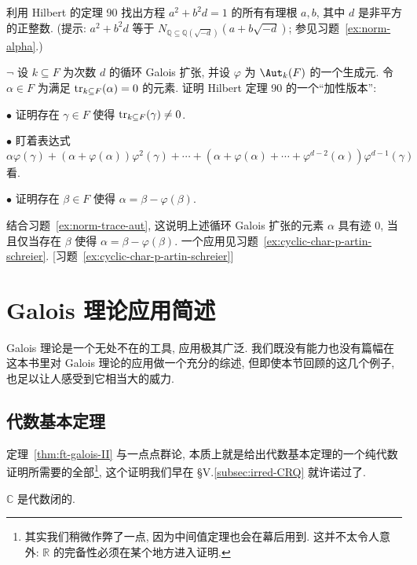 \begin{prob}\label{ex:hilbert90-rational}
利用 Hilbert 的定理 90 找出方程 $a^2+b^2d=1$ 的所有有理根 $a,b$, 其中 $d$ 是非平方的正整数. (提示: $a^2+b^2d$ 等于 $N_{\mathbb{Q}\subseteq\mathbb{Q}(\sqrt{-d})}(a+b\sqrt{-d})$; 参见习题~\ref{ex:norm-alpha}.)
\end{prob}

\begin{prob}\label{ex:hilbert90-additive}
$\neg$ 设 $k\subseteq F$ 为次数 $d$ 的循环 Galois 扩张, 并设 $\varphi$ 为 $\Aut_k(F)$ 的一个生成元. 令 $\alpha\in F$ 为满足 $\operatorname{tr}_{k\subseteq F}(\alpha)=0$ 的元素. 证明 Hilbert 定理 90 的一个``加性版本'':

$\bullet$ 证明存在 $\gamma\in F$ 使得 $\operatorname{tr}_{k\subseteq F}(\gamma)\neq 0$.

$\bullet$ 盯着表达式
\[
\alpha\varphi(\gamma)+(\alpha+\varphi(\alpha))\varphi^2(\gamma)+\cdots+(\alpha+\varphi(\alpha)+\cdots+\varphi^{d-2}(\alpha))\varphi^{d-1}(\gamma)
\]
看.

$\bullet$ 证明存在 $\beta\in F$ 使得 $\alpha=\beta-\varphi(\beta)$.

结合习题~\ref{ex:norm-trace-aut}, 这说明上述循环 Galois 扩张的元素 $\alpha$ 具有迹 $0$, 当且仅当存在 $\beta$ 使得 $\alpha=\beta-\varphi(\beta)$. 一个应用见习题~\ref{ex:cyclic-char-p-artin-schreier}. [习题~\ref{ex:cyclic-char-p-artin-schreier}]
\end{prob}

\section{Galois 理论应用简述}
\label{sec:galois-applications}

Galois 理论是一个无处不在的工具, 应用极其广泛. 我们既没有能力也没有篇幅在这本书里对 Galois 理论的应用做一个充分的综述, 但即使本节回顾的这几个例子, 也足以让人感受到它相当大的威力.

\subsection{代数基本定理}
\label{subsec:ft-algebra}

定理~\ref{thm:ft-galois-II} 与一点点群论, 本质上就是给出代数基本定理的一个纯代数证明所需要的全部\footnote{其实我们稍微作弊了一点, 因为中间值定理也会在幕后用到. 这并不太令人意外: $\mathbb{R}$ 的完备性必须在某个地方进入证明.}, 这个证明我们早在 §V.\ref{subsec:irred-CRQ} 就许诺过了.

\begin{theorem}\label{thm:ft-algebra}
$\mathbb{C}$ 是代数闭的.
\end{theorem}

